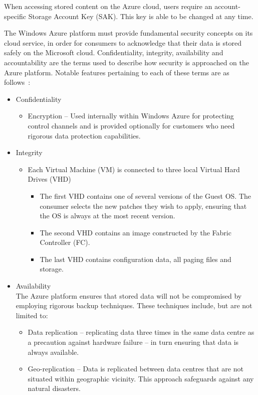When accessing stored content on the Azure cloud, users require an account-specific Storage Account Key (SAK). This key is able to be changed at any time.

The Windows Azure platform must provide fundamental security concepts on its cloud service, in order for consumers to acknowledge that their data is stored safely on the Microsoft cloud. Confidentiality, integrity, availability and accountability are the terms used to describe how security is approached on the Azure platform. Notable features pertaining to each of these terms are as follows~\cite{AzureSecurity}:

\begin{itemize}
\item Confidentiality
\begin{itemize}
\item Encryption -- Used internally within Windows Azure for protecting control channels and is provided optionally for customers who need rigorous data protection capabilities. 
\end{itemize}
\item Integrity
\begin{itemize}
\item Each Virtual Machine (VM) is connected to three local Virtual Hard Drives (VHD)
\begin{itemize}
\item The first VHD contains one of several versions of the Guest OS. The consumer selects the new patches they wish to apply, ensuring that the OS is always at the most recent version.
\item The second VHD contains an image constructed by the Fabric Controller (FC).
\item The last VHD contains configuration data, all paging files and storage. 
\end{itemize}
\end{itemize}
\item Availability \\ The Azure platform ensures that stored data will not be compromised by employing rigorous backup techniques. These techniques include, but are not limited to\ftAfour\ftAfourText:
\begin{itemize}
\item Data replication -- replicating data three times in the same data centre as a precaution against hardware failure – in turn ensuring that data is always available.
\item Geo-replication -- Data is replicated between data centres that are not situated within geographic vicinity. This approach safeguards against any natural disasters.
\end{itemize}


\end{itemize}
